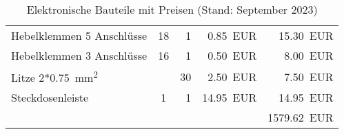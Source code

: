 \documentclass[./00PhotoBox.tex]{subfiles}
\begin{document}
\begin{table}[ht]
\begin{tabular}{l|c|r|r|r}
        Hebelklemmen 5 Anschlüsse              & 18     & 1              & \SI{0,85}{EUR}       & \SI{15,30}{EUR}   \\
        Hebelklemmen 3 Anschlüsse              & 16     & 1              & \SI{0,50}{EUR}       & \SI{8,00}{EUR}    \\
        Litze 2*\SI{0,75}{\square\milli\metre} &        & 30             & \SI{2,50}{EUR}       & \SI{7,50}{EUR}    \\
        Steckdosenleiste                       & 1      & 1              & \SI{14,95}{EUR}      & \SI{14,95}{EUR}   \\
                                               &        &                &                      & \SI{1579,62}{EUR} \\
    \end{tabular}
    \caption{Elektronische Bauteile mit Preisen (Stand: September 2023)}
    \label{tab:bauteile_elektronisch}
\end{table}
\end{document}
